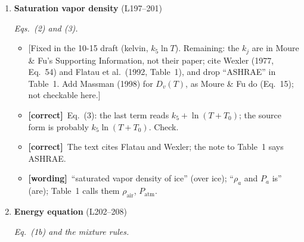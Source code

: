 \documentclass[11pt]{article}
\newcommand{\Pg}[3]{\item \textbf{#1} {\small(#2)}\par\textit{#3}}
\newcommand{\tC}{\textcolor{miss}{\textbf{[correct]}}\ }
\newcommand{\tG}{\textcolor{stale}{\textbf{[wording]}}\ }
\newcommand{\tA}{\textcolor{have}{\textbf{[add]}}\ }
\newcommand{\add}[1]{\textcolor{revB}{#1}}
\begin{document}
\begin{enumerate}
\begin{itemize}
  \item \add{[Done in 10-15 draft. Say once that $\rho_{\mathrm{ice}}$ departs from Moure \& Fu's Eq.~(31).]}
  \item \tC Eq.~(1b): the latent-heat term should carry $\rho_{\mathrm{ice}}$,
    as the solver does, not the mixture density, which integrates to about
    half across the interface.
  \item \tC ``$\varepsilon$ represents the interface width'': it is the
    interface parameter; the visible band is $9.2\,\varepsilon$ (Table~3
    says so).
  \item \tC Eq.~(1c) as printed has no $\xi_v$, but Tables 3 and 4 list
    $\xi_v = 10^{-3}$. Show it or explain it in one sentence.
  \item \tG ``Allen-Kahn'' (Cahn); ``localize this phenomena'' (localizes
    this term); the sentence defining $\alpha_{\mathrm{sub}}$ and $\rho_i$
    is run together.
  \item \tA $M_{\mathrm{sub}}$ and $\alpha_{\mathrm{sub}}$ are named and never
    given: $M_{\mathrm{sub}} = \varepsilon/(3\tau_{\mathrm{sub}})$,
    $\alpha_{\mathrm{sub}} = \lambda_{\mathrm{sub}}/\tau_{\mathrm{sub}}$,
    or a pointer to Moure \& Fu.
  \end{itemize}
\Pg{Saturation vapor density}{L197--201}{Eqs.~(2) and (3).}
  \begin{itemize}
  \item \add{[Fixed in the 10-15 draft (kelvin, $k_5\ln T$). Remaining: the $k_j$ are in Moure \& Fu's Supporting
    Information, not their paper; cite Wexler (1977, Eq.~54) and Flatau et al.\ (1992, Table~1), and drop ``ASHRAE'' in Table~1.
    Add Massman (1998) for $D_v(T)$, as Moure \& Fu do (Eq.~15); not checkable here.]}
  \item \tC Eq.~(3): the last term reads $k_5 + \ln(T + T_0)$; the source
    form is probably $k_5\ln(T + T_0)$. Check.
  \item \tC The text cites Flatau and Wexler; the note to Table~1 says
    ASHRAE.
  \item \tG ``saturated vapor density of ice'' (over ice); ``$\rho_a$ and
    $P_a$ is'' (are); Table~1 calls them $\rho_{\mathrm{air}}$,
    $P_{\mathrm{atm}}$.
  \end{itemize}
\Pg{Energy equation}{L202--208}{Eq.~(1b) and the mixture rules.}
  \begin{itemize}

\end{itemize}
\end{enumerate}
\end{document}
